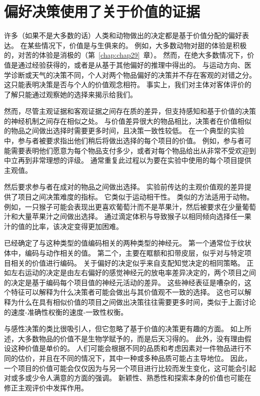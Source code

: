 \section{偏好决策使用了关于价值的证据}

许多（如果不是大多数的话）人类和动物做出的决定都是基于价值分配的偏好表达。 
在某些情况下，价值是与生俱来的。
例如，大多数动物对甜的体验是积极的，对苦的体验是消极的（第~\ref{chap:chap29}~章）。
然而，在绝大多数情况下，价值是通过经验获得的，或者是从基于其他偏好的推理中得出的。
与运动方向、医学诊断或天气的决策不同，个人对两个物品偏好的决策并不存在客观的对错之分。
这只能表明决策是否与个人的价值观念相符。
事实上，我们对主体对客体评价的了解只能通过观察她的选择来揭示给我们。


然而，尽管主观证据和客观证据之间存在质的差异，但支持感知和基于价值的决策的神经机制之间存在相似之处。
与价值差异很大的物品相比，决策者在价值相似的物品之间做出选择时需要更多时间，且决策一致性较低。
在一个典型的实验中，参与者被要求指出他们稍后将做出选择的每个项目的价值。
例如，参与者可能需要表明他们愿意为每个物品支付多少，或者对每个物品给出从非常不受欢迎到中立再到非常理想的评级。
通常重复此过程以为要在实验中使用的每个项目提供主观值。


然后要求参与者在成对的物品之间做出选择。
实验前传达的主观价值观的差异提供了项目之间决策难度的指标。
它类似于运动相干性。
类似的方法适用于动物。
例如，一只猴子可能会表现出更喜欢葡萄汁而不是苹果汁，然后被要求在少量葡萄汁和大量苹果汁之间做出选择。
通过滴定体积与导致猴子以相同倾向选择任一果汁的值的比率，该决定变得更加困难。


已经确定了与这种类型的值编码相关的两种类型的神经元。
第一个通常位于纹状体中，编码与动作相关的值。
第二个，主要在眶额和扣带皮层，似乎对与特定项目相关的价值进行编码。
关于偏好的决定似乎来自支配知觉决定的相同策略。
正如左右运动的决定是由左右偏好的感觉神经元的放电率差异决定的，两个项目之间的决定是基于编码每个项目值的神经元活动的差异。
这些神经表征是嘈杂的，这个特征可以解释为什么决策者可能会做出与其价值观不一致的选择。
这也可以解释为什么在具有相似价值的项目之间做出决策往往需要更多时间，类似于上面讨论的速度-准确性权衡的速度-一致性权衡。


与感性决策的类比很吸引人，但它忽略了基于价值的决策更有趣的方面。
如上所述，大多数物品的价值不是生物学赋予的，而是后天习得的。
此外，没有理由假设这种价值是单价的。
人们可能会根据不同的品质和考虑因素对一件物品进行不同的估价，并且在不同的情况下，其中一种或多种品质可能占主导地位。
因此，一个项目的价值可能会仅仅因为与另一个项目进行比较而发生变化，这可能会引起对或多或少令人满意的方面的强调。
新颖性、熟悉性和探索本身的价值也可能在修正主观评价中发挥作用。


